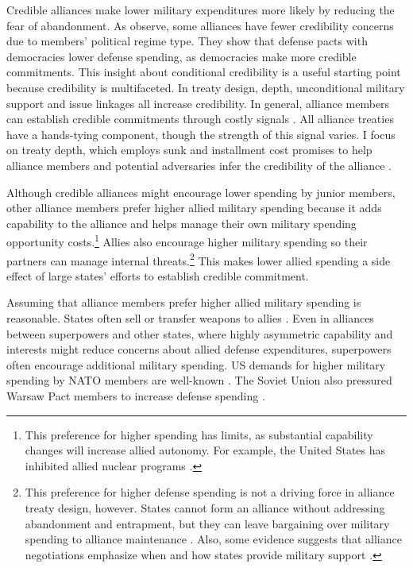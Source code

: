 \documentclass[12pt]{article}
\begin{document}
Credible alliances make lower military expenditures more likely by reducing the fear of abandonment. 
As \citet{DigiuseppePoast2018} observe, some alliances have fewer credibility concerns due to members' political regime type.
They show that defense pacts with democracies lower defense spending, as democracies make more credible commitments.
This insight about conditional credibility is a useful starting point because credibility is multifaceted. 
In treaty design, depth, unconditional military support \citep{Benson2012, Chibaetal2015} and issue linkages \citep{LongLeeds2006, Poast2012, Poast2013} all increase credibility.
In general, alliance members can establish credible commitments through costly signals \citep{Fearon1997, Quek2021}. 
All alliance treaties have a hands-tying component, though the strength of this signal varies.
I focus on treaty depth, which employs sunk and installment cost promises to help alliance members and potential adversaries infer the credibility of the alliance \citep{Leeds2003, FuhrmannSechser2014}. 


Although credible alliances might encourage lower spending by junior members, other alliance members prefer higher allied military spending because it adds capability to the alliance and helps manage their own military spending opportunity costs.\footnote{This preference for higher spending has limits, as substantial capability changes will increase allied autonomy. For example, the United States has inhibited allied nuclear programs \citep{Gavin2015, Lanoszka2015}.}
Allies also encourage higher military spending so their partners can manage internal threats.\footnote{
This preference for higher defense spending is not a driving force in alliance treaty design, however.
States cannot form an alliance without addressing abandonment and entrapment, but they can leave bargaining over military spending to alliance maintenance \citep{Snyder1997}.
Also, some evidence suggests that alliance negotiations emphasize when and how states provide military support \citep{Poast2019a}.} 
This makes lower allied spending a side effect of large states' efforts to establish credible commitment. 


Assuming that alliance members prefer higher allied military spending is reasonable. 
States often sell or transfer weapons to allies \citep{Yarhi-Miloetal2016, Pampetal2018}. 
Even in alliances between superpowers and other states, where highly asymmetric capability and interests might reduce concerns about allied defense expenditures, superpowers often encourage additional military spending. 
US demands for higher military spending by NATO members are well-known \citep{SchuesslerShifrinson2019}.
The Soviet Union also pressured Warsaw Pact members to increase defense spending \citep{Simon1985}. 
\end{document}
